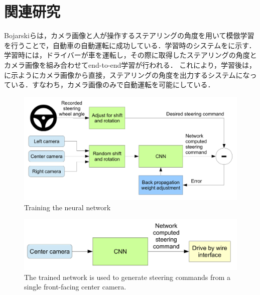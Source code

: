 
\section{関連研究}
     Bojarskiら\cite{bojarski}は，カメラ画像と人が操作するステアリングの角度を用いて模倣学習を行うことで，自動車の自動運転に成功している．学習時のシステムをに示す．学習時には，ドライバーが車を運転し，その際に取得したステアリングの角度とカメラ画像を組み合わせてend-to-end学習が行われる．
     これにより，学習後は，に示ようにカメラ画像から直接，ステアリングの角度を出力するシステムになっている．すなわち，カメラ画像のみで自動運転を可能にしている．
     
     \begin{figure}[h]
          \centering
          \includegraphics[keepaspectratio, scale=0.16] {images/bojarski_train.png}
          \caption{Training the neural network \cite{bojarski}}
          \label{Fig:bojarski_train}
     \end{figure}



     \begin{figure}[h]
          \centering
          \includegraphics[keepaspectratio, scale=0.20] {images/bojarski_test.png}
          \captionsetup{justification=raggedright} %
          \caption{The trained network is used to generate steering commands from a single front-facing center camera. \cite{bojarski}}
          \label{Fig:bojarski_test}
     \end{figure}

